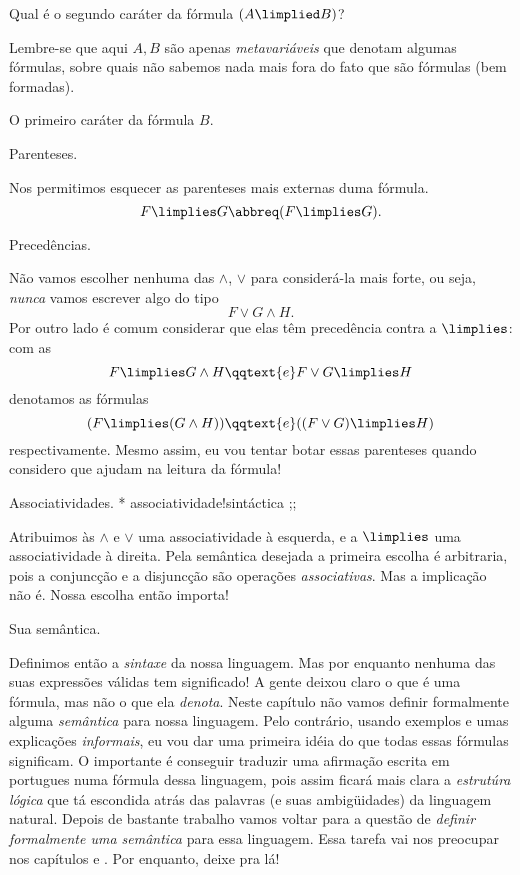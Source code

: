 Qual é o segundo caráter da fórmula $(A \limplied B)$?

\hint
Lembre-se que aqui $A,B$ são apenas \emph{metavariáveis}
que denotam algumas fórmulas, sobre quais não sabemos nada mais
fora do fato que são fórmulas (bem formadas).

\solution
O primeiro caráter da fórmula $B$.


\note Parenteses.

Nos permitimos esquecer as parenteses mais externas
duma fórmula.
$$
F \limplies G \abbreq (F \limplies G).
$$


\note Precedências.

Não vamos escolher nenhuma das $\land$, $\lor$ para considerá-la
mais forte, ou seja, \emph{nunca} vamos escrever algo do tipo
$$
F \lor G \land H.
$$
Por outro lado é comum considerar que elas têm precedência contra
a $\limplies$: com as
$$
F \limplies G \land H
\qqtext{e}
F \lor G \limplies H
$$
denotamos as fórmulas
$$
(F \limplies (G \land H))
\qqtext{e}
((F \lor G) \limplies H)
$$
respectivamente.
Mesmo assim, eu vou tentar botar essas parenteses quando considero
que ajudam na leitura da fórmula!


\note Associatividades.
\indexes
    * associatividade!sintáctica
    ;;

Atribuimos às $\land$ e $\lor$ uma associatividade à esquerda,
e a $\limplies$ uma associatividade à direita.
Pela semântica desejada a primeira escolha é arbitraria,
pois a conjuncção e a disjuncção são operações \emph{associativas}.
Mas a implicação não é.  Nossa escolha então importa!


\note Sua semântica.

Definimos então a \emph{sintaxe} da nossa linguagem.
Mas por enquanto nenhuma das suas expressões válidas
tem significado!
A gente deixou claro o que é uma fórmula, mas não
o que ela \emph{denota}.
Neste capítulo não vamos definir formalmente alguma
\emph{semântica} para nossa linguagem.
Pelo contrário, usando exemplos e umas explicações
\emph{informais}, eu vou dar uma primeira idéia do que
todas essas fórmulas significam.
O importante é conseguir traduzir uma afirmação escrita
em portugues numa fórmula dessa linguagem, pois assim
ficará mais clara a \emph{estrutúra lógica} que tá
escondida atrás das palavras (e suas ambigüidades)
da linguagem natural.
Depois de bastante trabalho vamos voltar para a questão
de \emph{definir formalmente uma semântica}
para essa linguagem.
Essa tarefa vai nos preocupar nos capítulos
 e .
Por enquanto, deixe pra lá!

